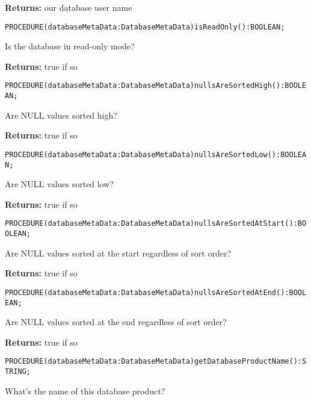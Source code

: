 {\bf Returns: } 
our database user name 




\verb'PROCEDURE(databaseMetaData:DatabaseMetaData)isReadOnly():BOOLEAN;'






Is the database in read-only mode? 


{\bf Returns: } 
true if so 




\verb'PROCEDURE(databaseMetaData:DatabaseMetaData)nullsAreSortedHigh():BOOLEAN;'






Are NULL values sorted high? 


{\bf Returns: } 
true if so 




\verb'PROCEDURE(databaseMetaData:DatabaseMetaData)nullsAreSortedLow():BOOLEAN;'






Are NULL values sorted low? 


{\bf Returns: } 
true if so 




\verb'PROCEDURE(databaseMetaData:DatabaseMetaData)nullsAreSortedAtStart():BOOLEAN;'






Are NULL values sorted at the start regardless of sort order? 


{\bf Returns: } 
true if so 




\verb'PROCEDURE(databaseMetaData:DatabaseMetaData)nullsAreSortedAtEnd():BOOLEAN;'






Are NULL values sorted at the end regardless of sort order? 


{\bf Returns: } 
true if so 




\verb'PROCEDURE(databaseMetaData:DatabaseMetaData)getDatabaseProductName():STRING;'






What's the name of this database product? 


